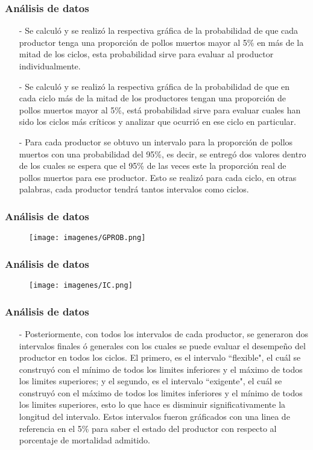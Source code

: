 \documentclass[11pt]{beamer}
\begin{document}
\begin{frame}
\frametitle{Análisis de datos}
\begin{itemize}
\justifying
\item[-]Se calculó y se realizó la respectiva gráfica de la probabilidad de que cada productor tenga una proporción de pollos muertos mayor al 5\% en más de la mitad de los ciclos, esta probabilidad sirve para evaluar al productor individualmente.
\item[-]Se calculó y se realizó la respectiva gráfica de la probabilidad de que en cada ciclo más de la mitad de los productores tengan una proporción de pollos muertos mayor al 5\%, está probabilidad sirve para evaluar cuales han sido los ciclos más críticos y analizar que ocurrió en ese ciclo en particular.
\item[-]Para cada productor se obtuvo un intervalo para la proporción de pollos muertos con una probabilidad del 95\%, es decir, se entregó dos valores dentro de los cuales se espera que el 95\% de las veces este la proporción real de pollos muertos para ese productor. Esto se realizó para cada ciclo, en otras palabras, cada productor tendrá tantos intervalos como ciclos.
\end{itemize}
\end{frame}

\begin{frame}
\frametitle{Análisis de datos}
\begin{figure}[!h]
        \texttt{[image: imagenes/GPROB.png]}
        \label{figura1}
\end{figure}
\end{frame}

\begin{frame}
\frametitle{Análisis de datos}
\begin{figure}[!h]
        \texttt{[image: imagenes/IC.png]}
        \label{figura1}
\end{figure}
\end{frame}

\begin{frame}
\frametitle{Análisis de datos}
\begin{itemize}
\justifying
\item[-]Posteriormente, con todos los intervalos de cada productor, se generaron dos intervalos finales ó generales con los cuales se puede evaluar el desempeño del productor en todos los ciclos. El primero, es el intervalo ``flexible", el cuál se construyó con el mínimo de todos los limites inferiores y el máximo de todos los limites superiores; y el segundo, es el intervalo ``exigente", el cuál se construyó con el máximo de todos los limites inferiores y el mínimo de todos los limites superiores, esto lo que hace es disminuir significativamente la longitud del intervalo. Estos intervalos fueron gráficados con una linea de referencia en el 5\% para saber el estado del productor con respecto al porcentaje de mortalidad admitido.
\end{itemize}
\end{frame}
\end{document}
